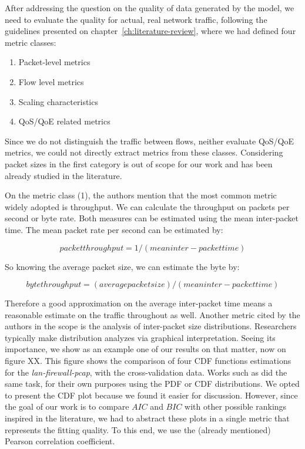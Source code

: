 After addressing the question on the quality of data generated by the model, we need to evaluate the quality for actual, real network traffic, following the guidelines presented on chapter~\ref{ch:literature-review}, where we had defined four metric classes:

\begin{enumerate}
\item  Packet-level metrics
\item  Flow level metrics
\item  Scaling characteristics
\item  QoS/QoE related metrics
\end{enumerate}

Since we do not distinguish the traffic between flows, neither evaluate  QoS/QoE metrics, we could not directly extract metrics from these classes. Considering packet sizes in the first category is out of scope for our work and has been already studied in the literature.

On the metric class (1), the authors mention that the most common metric widely adopted is throughput. We can calculate the throughput on packets per second or byte rate. Both measures can be estimated using the mean inter-packet time.
The mean packet rate per second can be estimated by:

\begin{equation}
\label{eq:pps-mean}
packet throughput = 1 / (mean inter-packet time)
\end{equation}

So knowing the average packet size, we can estimate the byte by:

\begin{equation}
\label{eq:th-mean}
byte throughput = (average packet size)/(mean inter-packet time)
\end{equation}

Therefore a good approximation on the average inter-packet time means a reasonable estimate on the traffic throughout as well. Another metric cited by the authors in the scope is the analysis of inter-packet size distributions. Researchers typically make distribution analyzes via graphical interpretation. Seeing its importance, we show as an example one of our results on that matter, now on figure XX. This figure shows the comparison of four  CDF functions estimations for the \textit{lan-firewall-pcap}, with the cross-validation data. Works such as \cite{ditg-paper} \cite{sourcesonoff-paper}\cite{do-you-trust}\cite{harpoon-validation}\cite{moongen-paper}\cite{modelling-of-self-similar} did the same task, for their own purposes using the PDF or CDF distributions. We opted to present the CDF plot because we found it easier for discussion. However, since the goal of our work is to compare $AIC$ and $BIC$  with other possible rankings inspired in the literature, we had to abstract these plots in a single metric that represents the fitting quality. To this end, we use the (already mentioned)  Pearson correlation coefficient.

